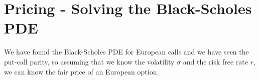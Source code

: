 
\section{Pricing - Solving the Black-Scholes PDE}

We have found the Black-Scholes PDE for European calls
and we have seen the put-call parity,
so assuming that we know the volatility $\sigma$ and the risk free rate $r$,
we can know the fair price of an European option.